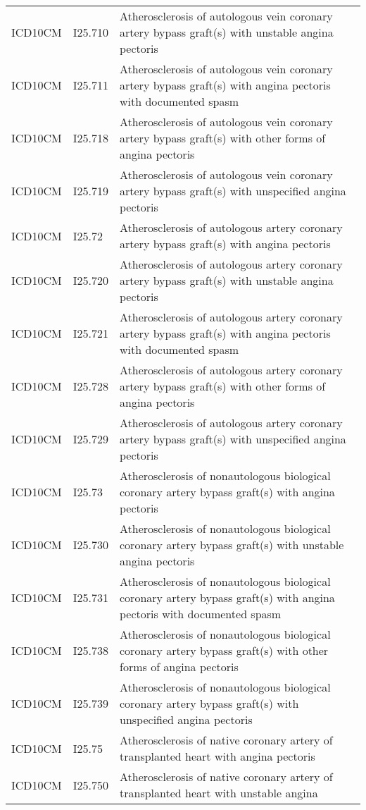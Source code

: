 \begin{longtable}{p{}p{}p{}}
  ICD10CM & I25.710 & Atherosclerosis of autologous vein coronary artery bypass graft(s) with unstable angina pectoris \\ 
  ICD10CM & I25.711 & Atherosclerosis of autologous vein coronary artery bypass graft(s) with angina pectoris with documented spasm \\ 
  ICD10CM & I25.718 & Atherosclerosis of autologous vein coronary artery bypass graft(s) with other forms of angina pectoris \\ 
  ICD10CM & I25.719 & Atherosclerosis of autologous vein coronary artery bypass graft(s) with unspecified angina pectoris \\ 
  ICD10CM & I25.72 & Atherosclerosis of autologous artery coronary artery bypass graft(s) with angina pectoris \\ 
  ICD10CM & I25.720 & Atherosclerosis of autologous artery coronary artery bypass graft(s) with unstable angina pectoris \\ 
  ICD10CM & I25.721 & Atherosclerosis of autologous artery coronary artery bypass graft(s) with angina pectoris with documented spasm \\ 
  ICD10CM & I25.728 & Atherosclerosis of autologous artery coronary artery bypass graft(s) with other forms of angina pectoris \\ 
  ICD10CM & I25.729 & Atherosclerosis of autologous artery coronary artery bypass graft(s) with unspecified angina pectoris \\ 
  ICD10CM & I25.73 & Atherosclerosis of nonautologous biological coronary artery bypass graft(s) with angina pectoris \\ 
  ICD10CM & I25.730 & Atherosclerosis of nonautologous biological coronary artery bypass graft(s) with unstable angina pectoris \\ 
  ICD10CM & I25.731 & Atherosclerosis of nonautologous biological coronary artery bypass graft(s) with angina pectoris with documented spasm \\ 
  ICD10CM & I25.738 & Atherosclerosis of nonautologous biological coronary artery bypass graft(s) with other forms of angina pectoris \\ 
  ICD10CM & I25.739 & Atherosclerosis of nonautologous biological coronary artery bypass graft(s) with unspecified angina pectoris \\ 
  ICD10CM & I25.75 & Atherosclerosis of native coronary artery of transplanted heart with angina pectoris \\ 
  ICD10CM & I25.750 & Atherosclerosis of native coronary artery of transplanted heart with unstable angina \\ 

\end{longtable}
